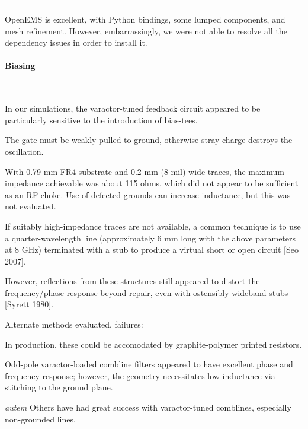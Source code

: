 \documentclass[paper.tex]{subfiles}
\begin{document}
\rule{\linewidth}{0.2pt}

OpenEMS is excellent, with Python bindings, some lumped components, and mesh refinement. However, embarrassingly, we were not able to resolve all the dependency issues in order to install it.





\paragraph{Biasing}\

In our simulations, the varactor-tuned feedback circuit appeared to be particularly sensitive to the introduction of bias-tees. 


The gate must be weakly pulled to ground, otherwise stray charge destroys the oscillation.




With 0.79 mm FR4 substrate and 0.2 mm (8 mil) wide traces, the maximum impedance achievable was about 115 ohms, which did not appear to be sufficient as an RF choke. Use of defected grounds can increase inductance, but this was not evaluated.

If suitably high-impedance traces are not available, a common technique is to use a quarter-wavelength line (approximately 6 mm long with the above parameters at 8 GHz) terminated with a stub to produce a virtual short or open circuit [Seo 2007]. 

However, reflections from these structures still appeared to distort the frequency/phase response beyond repair, even with ostensibly wideband stubs [Syrett 1980].

\noindent{}

Alternate methods evaluated, failures: 


In production, these could be accomodated by graphite-polymer printed resistors. 


Odd-pole varactor-loaded combline filters appeared to have excellent phase and frequency response; however, the geometry necessitates low-inductance via stitching to the ground plane.

\begin{autem}
	{\it autem} Others have had great success with varactor-tuned comblines, especially non-grounded lines.
\end{autem}
\end{document}
